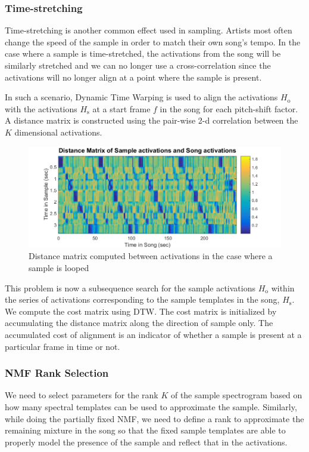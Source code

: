 \documentclass{article}
\begin{document}
\subsubsection{Time-stretching}

Time-stretching is another common effect used in sampling. Artists most often change the speed of the sample in order to match their own song's tempo. In the case where a sample is time-stretched, the activations from the song will be similarly stretched and we can no longer use a cross-correlation since the activations will no longer align at a point where the sample is present.

In such a scenario, Dynamic Time Warping is used to align the activations $H_\mathrm{o}$ with the activations $H_\mathrm{s}$ at a start frame $f$ in the song for each pitch-shift factor. A distance matrix is constructed using the pair-wise 2-d correlation between the $K$ dimensional activations. 
\begin{figure}[h!]
\centering
\includegraphics[width=\linewidth]{distmat.png}
\caption{Distance matrix computed between activations in the case where a sample is looped}
\label{fig2}
\end{figure}

This problem is now a subsequence search for the sample activations $H_\mathrm{o}$ within the series of activations corresponding to the sample templates in the song, $H_\mathrm{s}$. We compute the cost matrix using DTW. The cost matrix is initialized by accumulating the distance matrix along the direction of sample only. The accumulated cost of alignment is an indicator of whether a sample is present at a particular frame in time or not. 

\subsubsection{NMF Rank Selection}
\label{nmfrank}

We need to select parameters for the rank $K$ of the sample spectrogram based on how many spectral templates can be used to approximate the sample. Similarly, while doing the partially fixed NMF, we need to define a rank to approximate the remaining mixture in the song so that the fixed sample templates are able to properly model the presence of the sample and reflect that in the activations.
\end{document}
